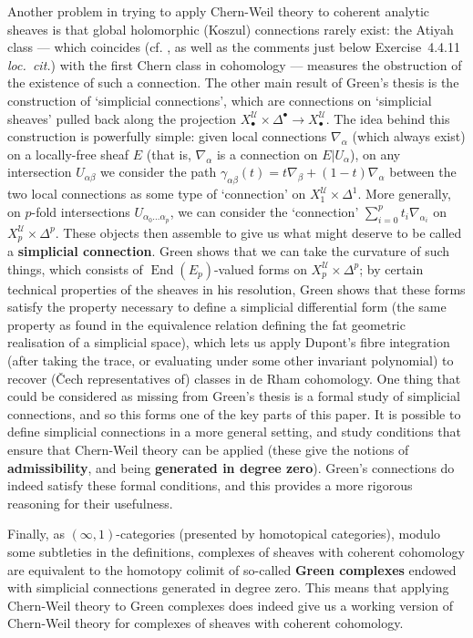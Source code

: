 \documentclass[11pt,fleqn]{article}
\theoremstyle{plain}
\theoremstyle{definition}
\theoremstyle{remark}
\numberwithin{equation}{theorem}
\newcommand{\cover}{\mathcal{U}}
\newcommand{\restricted}{\mathbin{\big\vert}}
\newcommand{\define}[1]{\textbf{#1}}
\newcommand{\nerve}[1]{X_{#1}^\cover}
\newcommand{\nervesimplex}[1]{\nerve{#1}\times\Delta^{#1}}
\DeclareMathOperator{\End}{End}
\begin{document}
    Another problem in trying to apply Chern-Weil theory to coherent analytic sheaves is that global holomorphic (Koszul) connections rarely exist: the Atiyah class --- which coincides (cf. \cite[Exercise~4.4.8]{Huybrechts2005}, as well as the comments just below Exercise~4.4.11 \emph{loc.~cit.}) with the first Chern class in cohomology --- measures the obstruction of the existence of such a connection.
    The other main result of Green's thesis is the construction of `simplicial connections', which are connections on `simplicial sheaves' pulled back along the projection $\nervesimplex{\bullet}\to\nerve{\bullet}$.
    The idea behind this construction is powerfully simple: given local connections $\nabla_\alpha$ (which always exist) on a locally-free sheaf $E$ (that is, $\nabla_\alpha$ is a connection on $E\restricted U_\alpha$), on any intersection $U_{\alpha\beta}$ we consider the path $\gamma_{\alpha\beta}(t) = t\nabla_\beta + (1-t)\nabla_\alpha$ between the two local connections as some type of `connection' on $\nerve{1}\times\Delta^1$.
    More generally, on $p$-fold intersections $U_{\alpha_0\ldots\alpha_p}$, we can consider the `connection' $\sum_{i=0}^p t_i\nabla_{\alpha_i}$ on $\nerve{p}\times\Delta^p$.
    These objects then assemble to give us what might deserve to be called a \define{simplicial connection}.
    Green shows that we can take the curvature of such things, which consists of $\End(E_p)$-valued forms on $\nerve{p}\times\Delta^p$; by certain technical properties of the sheaves in his resolution, Green shows that these forms satisfy the property necessary to define a simplicial differential form (the same property as found in the equivalence relation defining the fat geometric realisation of a simplicial space), which lets us apply Dupont's fibre integration (after taking the trace, or evaluating under some other invariant polynomial) to recover (Čech representatives of) classes in de Rham cohomology.
    One thing that could be considered as missing from Green's thesis is a formal study of simplicial connections, and so this forms one of the key parts of this paper.
    It is possible to define simplicial connections in a more general setting, and study conditions that ensure that Chern-Weil theory can be applied (these give the notions of \define{admissibility}, and being \define{generated in degree zero}).
    Green's connections do indeed satisfy these formal conditions, and this provides a more rigorous reasoning for their usefulness.

    Finally, as $(\infty,1)$-categories (presented by homotopical categories), modulo some subtleties in the definitions, complexes of sheaves with coherent cohomology are equivalent to the homotopy colimit of so-called \define{Gre{}en complexes} endowed with simplicial connections generated in degree zero.
    This means that applying Chern-Weil theory to Gre{}en complexes does indeed give us a working version of Chern-Weil theory for complexes of sheaves with coherent cohomology.
\end{document}
